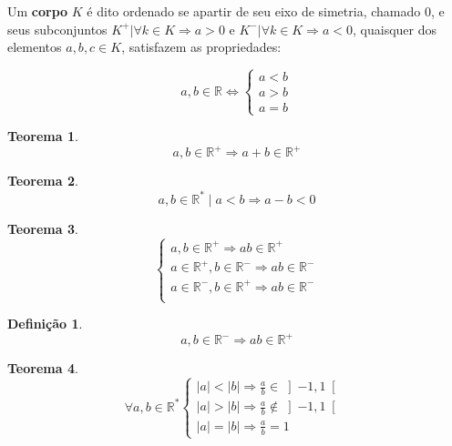\documentclass[
]{book}
\newtheorem{theorem}{Teorema}[chapter]
\theoremstyle{definition}
\newtheorem{definition}{Definição}[chapter]
\theoremstyle{definition}
\theoremstyle{definition}
\theoremstyle{definition}
\theoremstyle{remark}
\begin{document}
Um \textbf{corpo} \(K\) é dito ordenado se apartir de seu eixo de simetria, chamado \(0\), e seus subconjuntos \(K^+|\forall k \in K \Rightarrow a > 0\) e \(K^-|\forall k \in K \Rightarrow a < 0\), quaisquer dos elementos \(a, b, c \in K\), satisfazem as propriedades:

\begin{equation}
a,b \in \mathbb{R} \Leftrightarrow \left\{\begin{matrix} a < b\\ a > b \\ a = b \end{matrix}\right. \label{eq:tricotomia}
\end{equation}

\begin{theorem}
\protect\hypertarget{thm:thmordsum}{}\label{thm:thmordsum}\[
a, b \in \mathbb{R}^+ \Rightarrow a + b \in \mathbb{R}^+
\]
\end{theorem}

\begin{theorem}
\protect\hypertarget{thm:thmordsubrt}{}\label{thm:thmordsubrt}\[
a, b \in \mathbb{R}^* \mid a < b \Rightarrow a-b<0
\]
\end{theorem}

\begin{theorem}
\protect\hypertarget{thm:thmordmult}{}\label{thm:thmordmult}\[
\left\{\begin{matrix}
a,b \in \mathbb{R}^+ \Rightarrow ab \in \mathbb{R}^+ \\
a \in \mathbb{R}^+, b \in \mathbb{R}^- \Rightarrow ab \in \mathbb{R}^- \\
a \in \mathbb{R}^-, b \in \mathbb{R}^+ \Rightarrow ab \in \mathbb{R}^- \\
\end{matrix}\right.
\]
\end{theorem}

\begin{definition}
\protect\hypertarget{def:defordmult}{}\label{def:defordmult}\[
a,b \in \mathbb{R}^- \Rightarrow ab \in \mathbb{R}^+ 
\]
\end{definition}

\begin{theorem}
\protect\hypertarget{thm:thmorddiv}{}\label{thm:thmorddiv}\[
\forall a,b \in \mathbb{R}^* 
\left\{\begin{matrix}
|a| < |b| \Rightarrow \frac{a}{b} \in \left]-1,1 \right[\ \\
|a| > |b| \Rightarrow \frac{a}{b} \notin \left]-1,1 \right[\ \\
|a| = |b| \Rightarrow \frac{a}{b} = 1
\end{matrix}\right.
\]
\end{theorem}
\end{document}
